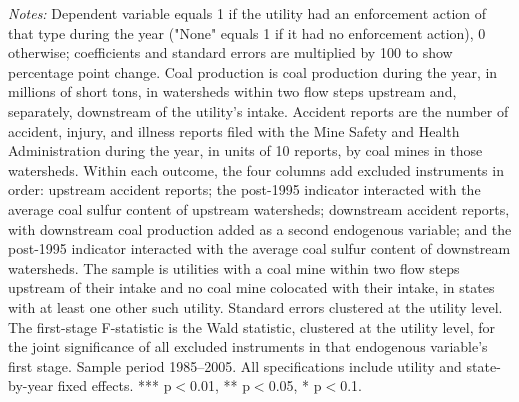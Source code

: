 \begin{table}[htbp]
\begin{minipage}{\linewidth}
\textit{Notes:} Dependent variable equals 1 if the utility had an enforcement action of that type during the year ("None" equals 1 if it had no enforcement action), 0 otherwise; coefficients and standard errors are multiplied by 100 to show percentage point change. Coal production is coal production during the year, in millions of short tons, in watersheds within two flow steps upstream and, separately, downstream of the utility's intake. Accident reports are the number of accident, injury, and illness reports filed with the Mine Safety and Health Administration during the year, in units of 10 reports, by coal mines in those watersheds. Within each outcome, the four columns add excluded instruments in order: upstream accident reports; the post-1995 indicator interacted with the average coal sulfur content of upstream watersheds; downstream accident reports, with downstream coal production added as a second endogenous variable; and the post-1995 indicator interacted with the average coal sulfur content of downstream watersheds. The sample is utilities with a coal mine within two flow steps upstream of their intake and no coal mine colocated with their intake, in states with at least one other such utility. Standard errors clustered at the utility level. The first-stage F-statistic is the Wald statistic, clustered at the utility level, for the joint significance of all excluded instruments in that endogenous variable's first stage. Sample period 1985--2005. All specifications include utility and state-by-year fixed effects. *** p$<$0.01, ** p$<$0.05, * p$<$0.1.
\end{minipage}
\end{table}
